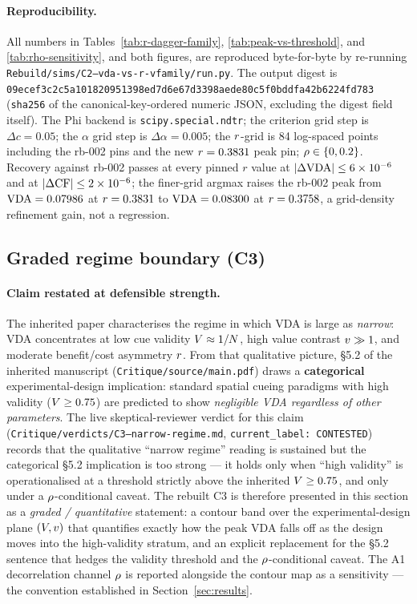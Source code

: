 \paragraph{Reproducibility.}
All numbers in Tables~\ref{tab:r-dagger-family},
\ref{tab:peak-vs-threshold}, and \ref{tab:rho-sensitivity}, and both
figures, are reproduced byte-for-byte by re-running
\texttt{Rebuild/sims/C2--vda-vs-r-vfamily/run.py}. The output digest
is \texttt{09ecef3c2c5a101820951398ed7d6e67d3398aede80c5f0bddfa42b6224fd783}
(\texttt{sha256} of the canonical-key-ordered numeric JSON,
excluding the digest field itself). The Phi backend is
\texttt{scipy.special.ndtr}; the criterion grid step is
$\Delta c = 0.05$; the $\alpha$ grid step is
$\Delta\alpha = 0.005$; the $r$-grid is 84 log-spaced points
including the rb-002 pins and the new $r = 0.3831$ peak pin;
$\rho \in \{0, 0.2\}$. Recovery against rb-002 passes at every
pinned $r$ value at $|\Delta \mathrm{VDA}| \le 6 \times 10^{-6}$ and at
$|\Delta \mathrm{CF}| \le 2 \times 10^{-6}$; the finer-grid argmax raises
the rb-002 peak from $\mathrm{VDA} = 0.07986$ at $r = 0.3831$ to
$\mathrm{VDA} = 0.08300$ at $r = 0.3758$, a grid-density refinement
gain, not a regression.

\subsection{Graded regime boundary (C3)}
\label{sec:results-c3}

\paragraph{Claim restated at defensible strength.}
The inherited paper characterises the regime in which VDA is large as
\emph{narrow}: VDA concentrates at low cue validity $V \approx
1/N$, high value contrast $v \gg 1$, and moderate
benefit/cost asymmetry $r$. From that qualitative picture, §5.2
of the inherited manuscript
(\texttt{Critique/source/main.pdf}) draws a \textbf{categorical}
experimental-design implication: standard spatial cueing paradigms
with high validity ($V \ge 0.75$) are predicted to show
\emph{negligible VDA regardless of other parameters}. The live
skeptical-reviewer verdict for this claim
(\texttt{Critique/verdicts/C3--narrow-regime.md},
\texttt{current\_label: CONTESTED}) records that the qualitative
``narrow regime'' reading is sustained but the categorical §5.2
implication is too strong --- it holds only when ``high validity'' is
operationalised at a threshold strictly above the inherited $V
\ge 0.75$, and only under a $\rho$-conditional caveat. The rebuilt
C3 is therefore presented in this section as a \emph{graded /
quantitative} statement: a contour band over the experimental-design
plane $(V, v)$ that quantifies exactly how the peak VDA
falls off as the design moves into the high-validity stratum, and an
explicit replacement for the §5.2 sentence that hedges the validity
threshold and the $\rho$-conditional caveat. The A1 decorrelation
channel $\rho$ is reported alongside the contour map as a
sensitivity --- the convention established in Section~\ref{sec:results}.

